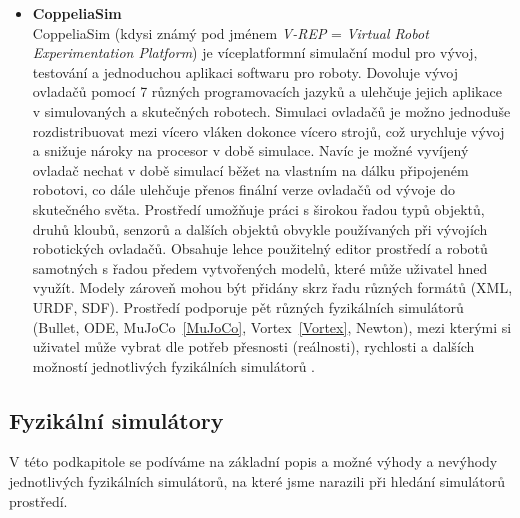 \begin{itemize}
    \item \textbf{CoppeliaSim}\\ CoppeliaSim (kdysi známý pod jménem
        \emph{V-REP} = \emph{Virtual Robot Experimentation Platform}) je
        víceplatformní simulační modul pro vývoj, testování a jednoduchou
        aplikaci softwaru pro roboty. Dovoluje vývoj ovladačů pomocí 7 různých
        programovacích jazyků a ulehčuje jejich aplikace v simulovaných a
        skutečných robotech. Simulaci ovladačů je možno jednoduše
        rozdistribuovat mezi vícero vláken dokonce vícero strojů, což urychluje
        vývoj a snižuje nároky na procesor v době simulace. Navíc je možné
        vyvíjený ovladač nechat v době simulací běžet na vlastním na dálku
        připojeném robotovi, co dále ulehčuje přenos finální verze ovladačů od
        vývoje do skutečného světa. Prostředí umožňuje práci s širokou řadou
        typů objektů, druhů kloubů, senzorů a dalších objektů obvykle
        používaných při vývojích robotických ovladačů. Obsahuje lehce
        použitelný editor prostředí a robotů samotných s řadou předem
        vytvořených modelů, které může uživatel hned využít. Modely zároveň
        mohou být přidány skrz řadu různých formátů (XML, URDF, SDF). Prostředí
        podporuje pět různých fyzikálních simulátorů (Bullet, ODE,
        MuJoCo~\ref{MuJoCo}, Vortex~\ref{Vortex}, Newton), mezi kterými si
        uživatel může vybrat dle potřeb přesnosti (reálnosti), rychlosti a
        dalších možností jednotlivých fyzikálních simulátorů
        \citep{coppeliaSim} \citep{nogueira2014comparative}.
\end{itemize}

\subsection{Fyzikální simulátory} \label{Simulované prostředí - f simulátory}

V této podkapitole se podíváme na základní popis a možné výhody a nevýhody
jednotlivých fyzikálních simulátorů, na které jsme narazili při hledání
simulátorů prostředí.

